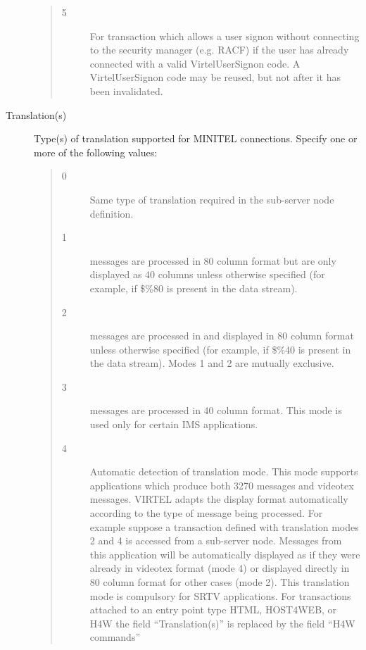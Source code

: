\documentclass[letterpaper,10pt,english]{sphinxmanual}
\begin{document}
\begin{description}
\begin{quote}
\begin{description}
\item[{5}] \leavevmode
For transaction which allows a user signon without connecting to the security manager (e.g. RACF) if the user has already connected with a valid VirtelUserSignon code. A VirtelUserSignon code may be reused, but not after it has been invalidated.

\end{description}
\end{quote}

\item[{Translation(s)}] \leavevmode
Type(s) of translation supported for MINITEL connections. Specify one or more of the following values:
\begin{quote}
\begin{description}
\item[{0}] \leavevmode
Same type of translation required in the sub-server node definition.

\item[{1}]  messages are processed in 80 column format but are only displayed as 40 columns unless otherwise specified (for example, if \$\%80 is present in the data stream).

\item[{2}]  messages are processed in and displayed in 80 column format unless otherwise specified (for example, if \$\%40 is present in the data stream).
Modes 1 and 2 are mutually exclusive.

\item[{3}]  messages are processed in 40 column format. This mode is used only for certain IMS applications.

\item[{4}] \leavevmode
Automatic detection of translation mode.
This mode supports applications which produce both 3270 messages and videotex messages. VIRTEL adapts the display format automatically according to the type of message being processed. For example suppose a transaction defined with translation modes 2 and 4 is accessed from a sub-server node. Messages from this application will be automatically displayed as if they were already in videotex format (mode 4) or displayed directly in 80 column format for other cases (mode 2).
This translation mode is compulsory for SRTV applications.
For transactions attached to an entry point type HTML, HOST4WEB, or H4W the field “Translation(s)” is replaced by the field “H4W commands”

\end{description}
\end{quote}


\end{description}
\end{document}
